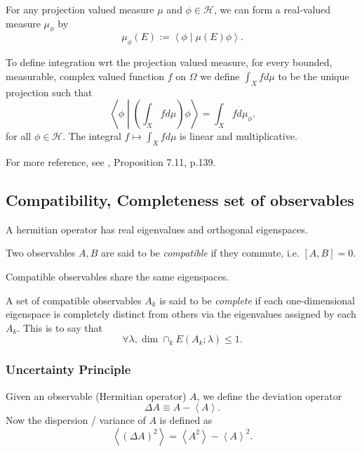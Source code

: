 For any projection valued measure $\mu$ and $\phi \in \mathcal{H}$, we can form a real-valued measure $\mu_{\phi}$ by
\[
	\mu_{\phi}(E) := \left\langle \phi \middle| \mu(E) \phi \right\rangle 
.\] 

To define integration wrt the projection valued measure, for every bounded, measurable, complex valued function $f$ on $\Omega$ we define $\int _X f d \mu$ to be the unique projection such that
\[
	\left\langle \phi \middle| \left( \int _X f d \mu \right) \phi \right\rangle  = \int _X f d \mu_{\phi}
.\] 
for all $\phi \in \mathcal{H}$. The integral $f \mapsto \int _X f d \mu$ is linear and multiplicative.

For more reference, see \cite{hallQuantumTheory2013}, Proposition 7.11, p.139.

\subsection{Compatibility, Completeness set of observables}

A hermitian operator has real eigenvalues and orthogonal eigenspaces.

Two observables $A, B$ are said to be \textit{compatible} if they commute, i.e. $[A,B] = 0$. 

Compatible observables share the same eigenspaces.

A set of compatible observables  $A_k$ is said to be  \textit{complete} if each one-dimensional eigenspace is completely distinct from others via the eigenvalues assigned by each $A_k$. This is to say that
\[
	\forall \lambda, \dim \cap_k E(A_k;\lambda) \le 1
.\] 

\subsubsection{Uncertainty Principle}

Given an observable (Hermitian operator) $A$, we define the deviation operator
\[
	\Delta A \equiv A - \left\langle A \right\rangle 
.\] 
Now the dispersion / variance of $A$ is defined as
\[
	\left\langle (\Delta A)^2 \right\rangle  = \left\langle A^2 \right\rangle  - \left\langle A \right\rangle ^2
.\] 


